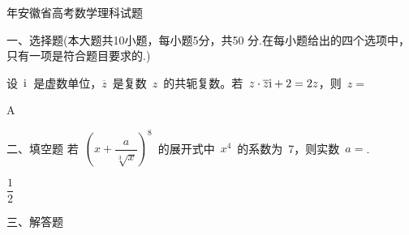 \renewcommand\solution[1]{\fullwidth{\large\heiti#1\songti}}


\newpage
{}

\begin{center} {\Huge{年安徽省高考数学理科试题}}
\end{center}



{\heiti\hspace*{-6mm}一、选择题}(本大题共10小题，每小题5分，共50 分.在每小题给出的四个选项中，只有一项是符合题目要求的.)
\begin{problems}

\qu 设~$\text{i}$~是虚数单位，$\overline{z}$~是复数~$z$~的共轭复数。若~$z\cdot\overline{z}\text{i}+2=2z$，则~$z=$\kh
{}
\begin{sol}
A
\end{sol}



{\heiti\hspace*{-6mm}二、填空题}
\qu 若~$(x+\dfrac{a}{\sqrt[3]{x}})^8$~的展开式中~$x^4$~的系数为~7，则实数~$a=$\xhx.
\begin{sol}
$\dfrac{1}{2}$
\end{sol}





{\heiti\hspace*{-6mm}三、解答题}


\end{problems}


\newpage

\begin{center}\end{center}

